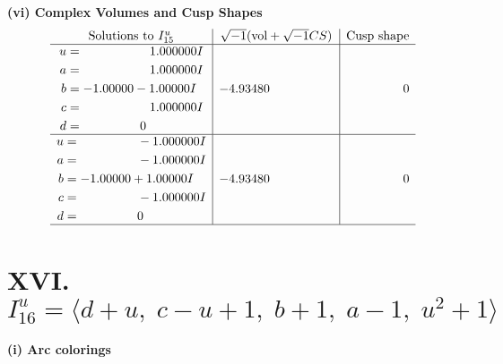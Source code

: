 \documentclass[1p]{elsarticle_modified}
\theoremstyle{definition}
\newcommand{\I}{\sqrt{-1}}
\begin{document}
\newpage\flushleft \textbf{(vi) Complex Volumes and Cusp Shapes}
$$\begin{array}{c|c|c}  
\text{Solutions to }I^u_{15}& \I (\text{vol} + \sqrt{-1}CS) & \text{Cusp shape}\\
 \hline 
\begin{aligned}
u &= \phantom{-0.000000 -}1.000000 I \\
a &= \phantom{-0.000000 -}1.000000 I \\
b &= -1.00000 - 1.00000 I \\
c &= \phantom{-0.000000 -}1.000000 I \\
d &= \phantom{-0.000000 } 0\end{aligned}
 & -4.93480\phantom{ +0.000000I} & \phantom{-0.000000 } 0 \\ \hline\begin{aligned}
u &= \phantom{-0.000000 } -1.000000 I \\
a &= \phantom{-0.000000 } -1.000000 I \\
b &= -1.00000 + 1.00000 I \\
c &= \phantom{-0.000000 } -1.000000 I \\
d &= \phantom{-0.000000 } 0\end{aligned}
 & -4.93480\phantom{ +0.000000I} & \phantom{-0.000000 } 0\\
 \hline 
 \end{array}$$\newpage\newpage\renewcommand{\arraystretch}{1}
\centering \section*{XVI. $I^u_{16}= \langle d+u,\;c- u+1,\;b+1,\;a-1,\;u^2+1 \rangle$}
\flushleft \textbf{(i) Arc colorings}\\
\end{document}
